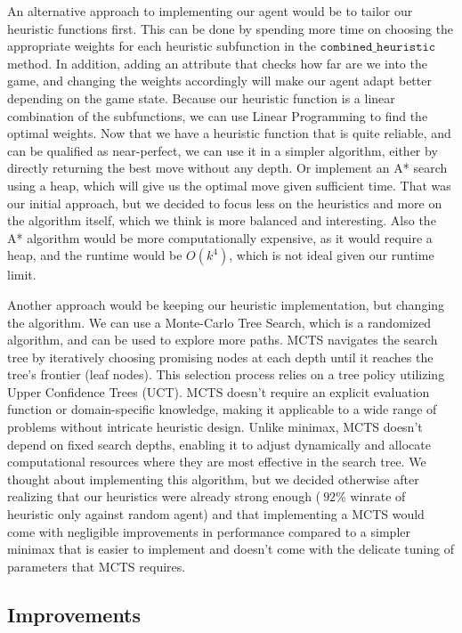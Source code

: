 \documentclass[11pt]{article}
\begin{document}
An alternative approach to implementing our agent would be to tailor our heuristic functions first. This can be done by spending more time on choosing the appropriate weights for each heuristic 
subfunction in the $\texttt{combined\_heuristic}$ method. In addition, adding an attribute that checks how far are we into the game, and changing the weights accordingly
will make our agent adapt better depending on the game state. Because our heuristic function is a linear combination of the subfunctions, we can use Linear Programming to find the optimal weights.
Now that we have a heuristic function that is quite reliable, and can be qualified as near-perfect, we can use it in a simpler algorithm, either by directly returning the best move without any depth.
Or implement an A* search using a heap, which will give us the optimal move given sufficient time. That was our initial approach, but we decided to focus less on the heuristics and more on the algorithm itself, which
we think is more balanced and interesting. Also the A* algorithm would be more computationally expensive, as it would require a heap, and the runtime would be $O(k^4)$, which is not ideal given our runtime limit.

Another approach would be keeping our heuristic implementation, but changing the algorithm. We can use a Monte-Carlo Tree Search, which is a randomized algorithm, and can be used to explore more paths.
MCTS navigates the search tree by iteratively choosing promising nodes at each depth until it reaches the tree's frontier (leaf nodes). This selection process relies on a tree policy utilizing Upper Confidence Trees (UCT).
MCTS doesn't require an explicit evaluation function or domain-specific knowledge, making it applicable to a wide range of problems without intricate heuristic design. Unlike minimax, MCTS doesn't depend 
on fixed search depths, enabling it to adjust dynamically and allocate computational resources where they are most effective in the search tree. We thought about implementing this algorithm, but we decided otherwise
after realizing that our heuristics were already strong enough ($~92\%$ winrate of heuristic only against random agent) and that implementing a MCTS would come with negligible improvements in performance compared to a simpler
minimax that is easier to implement and doesn't come with the delicate tuning of parameters that MCTS requires.

\subsection{Improvements}
\end{document}
